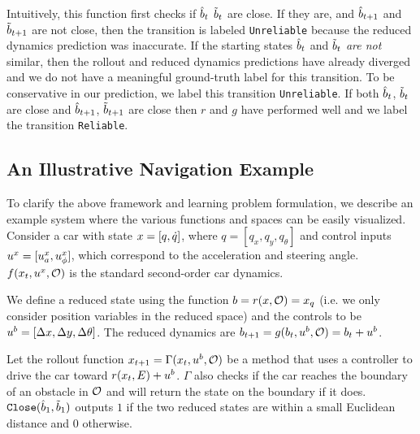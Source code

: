 Intuitively, this function first checks if $\hat{b}_t$ $\tilde{b}_t$ are close. If they are, and $\hat{b}_{t+1}$ and $\tilde{b}_{t+1}$ are not close, then the transition is labeled \texttt{Unreliable} because the reduced dynamics prediction was inaccurate. If the starting states $\hat{b}_t$ and $\tilde{b}_t$ \textit{are not} similar, then the rollout and reduced dynamics predictions have already diverged and we do not have a meaningful ground-truth label for this transition. To be conservative in our prediction, we label this transition \texttt{Unreliable}. If both $\hat{b}_t$, $\tilde{b}_t$ are close and $\hat{b}_{t+1}$, $\tilde{b}_{t+1}$ are close then $r$ and $g$ have performed well and we label the transition \texttt{Reliable}.

\subsection{An Illustrative Navigation Example}
\label{sec:car_example}

To clarify the above framework and learning problem formulation, we describe an example system where the various functions and spaces can be easily visualized. Consider a car with state $x = [q,\dot{q}]$, where $q = [q_x,q_y,q_\theta]$ and control inputs $u^x = [u^x_a,u^x_\phi]$, which correspond to the acceleration and steering angle. $f(x_t,u^x,\mathcal{O})$ is the standard second-order car dynamics. 

We define a reduced state using the function $b = r(x,\mathcal{O}) = x_q$ (i.e. we only consider position variables in the reduced space) and the controls to be $u^b = [\Delta x,\Delta y, \Delta \theta ]$. The reduced dynamics are $b_{t+1} = g(b_t,u^b,\mathcal{O}) = b_t + u^b$.

Let the rollout function $x_{t+1} = \Gamma(x_t,u^b,\mathcal{O})$ be a method that uses a controller to drive the car toward $r(x_t,E) + u^b$. $\Gamma$ also checks if the car reaches the boundary of an obstacle in $\mathcal{O}$ and will return the state on the boundary if it does. $\texttt{Close}(\hat{b}_1,\tilde{b}_1)$ outputs $1$ if the two reduced states are within a small Euclidean distance and $0$ otherwise. 

